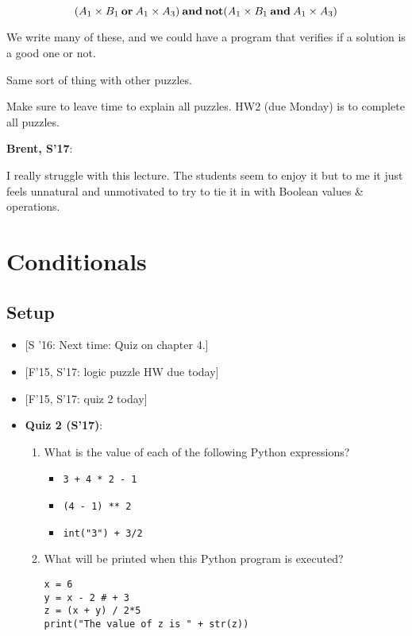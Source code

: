 \documentclass{article}
\newenvironment{reflect}[1]
{
  \noindent
  \begin{lrbox}{\reflectbox}
    \begin{minipage}[t]{\textwidth}
      \textbf{#1}:
}{
    \end{minipage}
  \end{lrbox}
  \fbox{\usebox{\reflectbox}}
}
\begin{document}
\[ (A_1 \times B_1 \mathbin{\mathbf{or}} A_1 \times A_3) \mathbin{\mathbf{and}} \mathbin{\mathbf{not}} (A_1 \times B_1 \mathbin{\mathbf{and}} A_1
\times A_3) \]

We write many of these, and we could have a program that verifies if a
solution is a good one or not.

Same sort of thing with other puzzles.

Make sure to leave time to explain all puzzles.  HW2 (due Monday) is
to complete all puzzles.

\begin{reflect}{Brent, S'17}
  I really struggle with this lecture.  The students seem to enjoy it
  but to me it just feels unnatural and unmotivated to try to tie it
  in with Boolean values \& operations.
\end{reflect}

\newpage

\section{Conditionals}

\subsection*{Setup}

\begin{itemize}
\item{} [S '16: Next time: Quiz on chapter 4.]
\item{} [F'15, S'17: logic puzzle HW due today]
\item{} [F'15, S'17: quiz 2 today]
\item \textbf{Quiz 2 (S'17)}:
  \begin{enumerate}
  \item What is the value of each of the following
    Python expressions?
    \begin{itemize}
    \item \verb|3 + 4 * 2 - 1|
    \item \verb|(4 - 1) ** 2|
    \item \verb|int("3") + 3/2|
    \end{itemize}

  \item What will be printed when this Python program is executed?

\begin{verbatim}
x = 6
y = x - 2 # + 3
z = (x + y) / 2*5
print("The value of z is " + str(z))
\end{verbatim}
  \end{enumerate}

\end{itemize}
\end{document}

